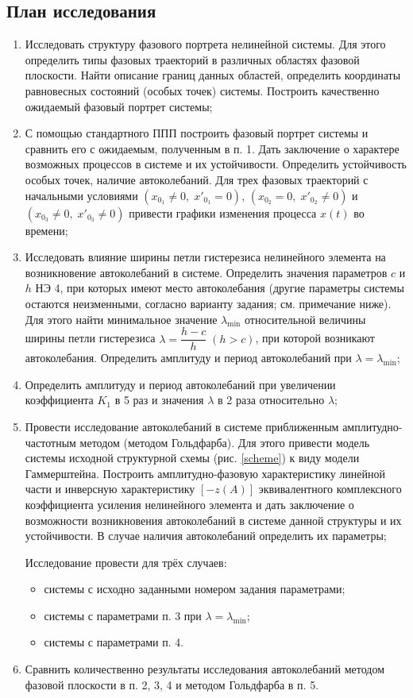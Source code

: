 	\subsection{План исследования}
	
	\begin{enumerate}
		\item Исследовать структуру фазового портрета нелинейной системы. Для этого определить типы фазовых траекторий в различных областях фазовой плоскости. Найти описание границ данных областей, определить координаты равновесных состояний (особых точек) системы. Построить качественно ожидаемый фазовый портрет системы;
		\item С помощью стандартного ППП построить фазовый портрет системы и сравнить его с ожидаемым, полученным в п. 1. Дать заключение о характере возможных процессов в системе и их устойчивости. Определить устойчивость особых точек, наличие автоколебаний. Для трех фазовых траекторий с начальными условиями $(x_{0_1} \neq 0,\;x'_{0_1}=0)$,  $(x_{0_2} = 0,\;x'_{0_2} 
		\neq 0)$ и $(x_{0_3}\neq 0,\;x'_{0_3}\neq 0)$ привести графики изменения процесса $x(t)$ во времени;
		\item Исследовать влияние ширины петли гистерезиса нелинейного элемента на возникновение автоколебаний в системе. Определить значения параметров $c$ и $h$ НЭ 4, при которых имеют место автоколебания (другие параметры системы остаются неизменными, согласно варианту задания; см. примечание ниже). Для этого найти минимальное значение $\lambda_{\min}$ относительной величины ширины петли гистерезиса $\lambda = \dfrac{h-c}{h}\;(h>c)$, при которой возникают автоколебания. Определить амплитуду и
		период автоколебаний при $\lambda = \lambda_{\min}$;
		\item Определить амплитуду и период автоколебаний при увеличении коэффициента
		$K_1$ в 5 раз и значения $\lambda$ в 2 раза относительно $\lambda$;
		\item Провести исследование автоколебаний в системе приближенным амплитудно-частотным методом (методом Гольдфарба). Для этого привести модель системы исходной структурной схемы (рис. \ref{scheme}) к виду модели Гаммерштейна. Построить амплитудно-фазовую характеристику линейной части и инверсную характеристику $[-z(A)]$ эквивалентного
		комплексного коэффициента усиления нелинейного элемента и дать заключение о возможности возникновения автоколебаний в системе данной структуры и их устойчивости. В случае наличия автоколебаний	определить их параметры;
		
		Исследование провести для трёх случаев:
		\begin{itemize}
			\item системы с исходно заданными номером задания параметрами;
			\item системы с параметрами п. 3 при $\lambda = \lambda_{\min}$;
			\item системы с параметрами п. 4.
		\end{itemize}
		\item Сравнить количественно результаты исследования автоколебаний методом фазовой плоскости в п. 2, 3, 4 и методом Гольдфарба в п. 5.
	\end{enumerate}
	
